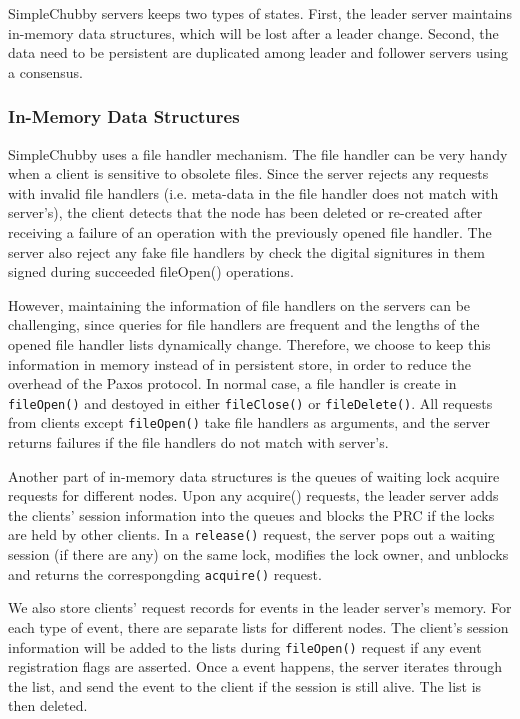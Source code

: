 SimpleChubby servers keeps two types of states. First, the
leader server maintains in-memory data structures, which will be lost
after a leader change. Second, the data need to be persistent are duplicated
among leader and follower servers using a consensus.


\subsubsection{In-Memory Data Structures}

SimpleChubby uses a file handler mechanism. The file handler can be very
handy when a client is sensitive to obsolete files. Since the server
rejects any requests with invalid file handlers (i.e. meta-data in the file
handler does not match with server's), the client detects that the node has
been deleted or re-created after receiving a failure of an operation with
the previously opened file handler. The server also reject any fake file
handlers by check the digital signitures in them signed during succeeded
fileOpen() operations.

However, maintaining the information of file handlers on the servers can
be challenging, since queries for file handlers are frequent and the lengths
of the opened file handler lists dynamically change. Therefore, we choose
to keep this information in memory instead of in persistent store, in order
to reduce the overhead of the Paxos protocol. In normal case, a file handler
is create in \texttt{fileOpen()} and destoyed in either \texttt{fileClose()}
or \texttt{fileDelete()}.
All requests from clients except \texttt{fileOpen()} take file handlers as
arguments,
and the server returns failures if the file handlers do not match with
server's.

Another part of in-memory data structures is the queues of waiting lock acquire
requests for different nodes. Upon any acquire() requests, the leader server
adds the clients' session information into the queues and blocks the PRC
if the locks are held by other clients.
In a \texttt{release()} request, the server pops out a waiting session
(if there are any) on the same lock, modifies the lock owner, and unblocks and
returns the correspongding \texttt{acquire()} request.

We also store clients' request records for events in the leader server's memory.
For each type of event, there are separate lists for different nodes.
The client's session information will be added to the lists during \texttt{fileOpen()}
request if any event registration flags are asserted. Once a event happens,
the server iterates through the list, and send the event to the client if the
session is still alive. The list is then deleted.



